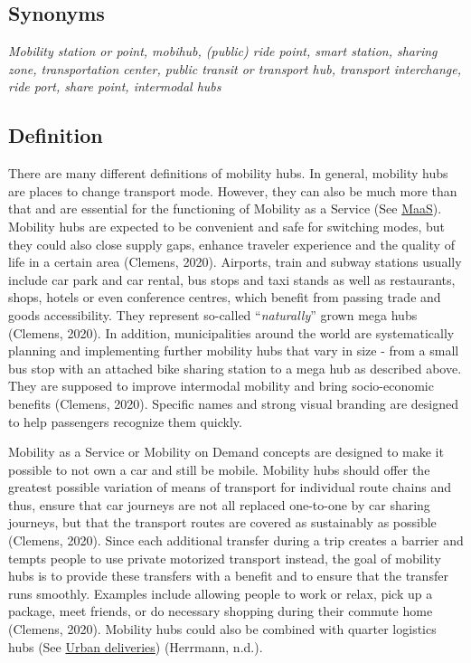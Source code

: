 \documentclass[
]{book}
\begin{document}
\hypertarget{synonyms-18}{%
\subsection*{Synonyms}\label{synonyms-18}}

\emph{Mobility station or point, mobihub, (public) ride point, smart station, sharing zone, transportation center, public transit or transport hub, transport interchange, ride port, share point, intermodal hubs}

\hypertarget{definition-20}{%
\subsection*{Definition}\label{definition-20}}

There are many different definitions of mobility hubs. In general, mobility hubs are places to change transport mode. However, they can also be much more than that and are essential for the functioning of Mobility as a Service (See \protect\hyperlink{maas}{MaaS}). Mobility hubs are expected to be convenient and safe for switching modes, but they could also close supply gaps, enhance traveler experience and the quality of life in a certain area (Clemens, 2020). Airports, train and subway stations usually include car park and car rental, bus stops and taxi stands as well as restaurants, shops, hotels or even conference centres, which benefit from passing trade and goods accessibility. They represent so-called ``\emph{naturally}'' grown mega hubs (Clemens, 2020). In addition, municipalities around the world are systematically planning and implementing further mobility hubs that vary in size - from a small bus stop with an attached bike sharing station to a mega hub as described above. They are supposed to improve intermodal mobility and bring socio-economic benefits (Clemens, 2020). Specific names and strong visual branding are designed to help passengers recognize them quickly.

Mobility as a Service or Mobility on Demand concepts are designed to make it possible to not own a car and still be mobile. Mobility hubs should offer the greatest possible variation of means of transport for individual route chains and thus, ensure that car journeys are not all replaced one-to-one by car sharing journeys, but that the transport routes are covered as sustainably as possible (Clemens, 2020). Since each additional transfer during a trip creates a barrier and tempts people to use private motorized transport instead, the goal of mobility hubs is to provide these transfers with a benefit and to ensure that the transfer runs smoothly. Examples include allowing people to work or relax, pick up a package, meet friends, or do necessary shopping during their commute home (Clemens, 2020). Mobility hubs could also be combined with quarter logistics hubs (See \protect\hyperlink{urban_delivery}{Urban deliveries}) (Herrmann, n.d.).
\end{document}
